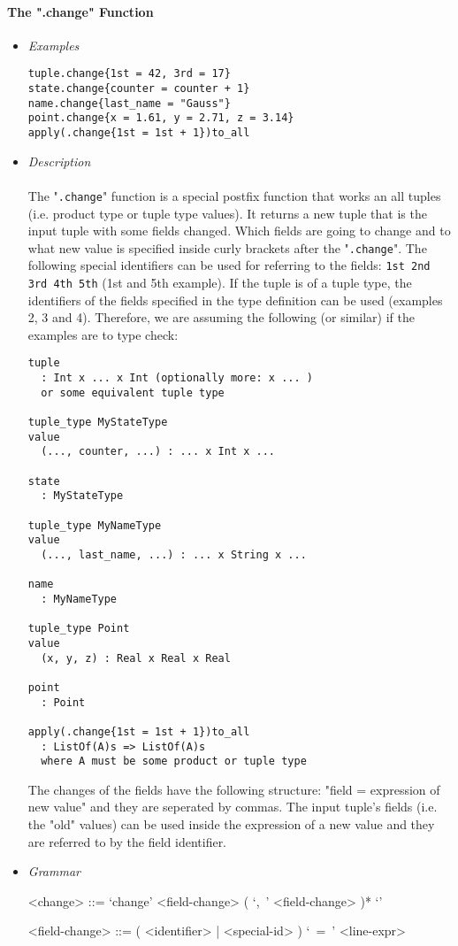 \documentclass{article}
\begin{document}
\paragraph{The ".change" Function}

\begin{itemize}

\item \textit{Examples}

\begin{verbatim}
tuple.change{1st = 42, 3rd = 17}
state.change{counter = counter + 1} 
name.change{last_name = "Gauss"}
point.change{x = 1.61, y = 2.71, z = 3.14}
apply(.change{1st = 1st + 1})to_all
\end{verbatim}

\item \textit{Description} \\\\
The "\texttt{.change}" function is a special postfix function that works an all
tuples (i.e. product type or tuple type values). It returns a new tuple that is
the input tuple with some fields changed. Which fields are going to change and
to what new value is specified inside curly brackets after the
"\texttt{.change}". The following special identifiers can be used for referring
to the fields: \texttt{1st 2nd 3rd 4th 5th} (1st and 5th example). If the tuple
is of a tuple type, the identifiers of the fields specified in the type
definition can be used (examples 2, 3 and 4). Therefore, we are assuming the
following (or similar) if the examples are to type check:

\begin{verbatim}
tuple
  : Int x ... x Int (optionally more: x ... )
  or some equivalent tuple type

tuple_type MyStateType
value
  (..., counter, ...) : ... x Int x ...

state
  : MyStateType

tuple_type MyNameType
value
  (..., last_name, ...) : ... x String x ...

name
  : MyNameType

tuple_type Point
value
  (x, y, z) : Real x Real x Real

point
  : Point

apply(.change{1st = 1st + 1})to_all
  : ListOf(A)s => ListOf(A)s
  where A must be some product or tuple type
\end{verbatim}
The changes of the fields have the following structure: "field = expression of
new value" and they are seperated by commas. The input tuple's fields (i.e. the
"old" values) can be used inside the expression of a new value and they are
referred to by the field identifier.
\item \textit{Grammar}

\begin{grammar}
<change> ::= `change{' <field-change> ( `,\ ' <field-change> )* `}'

<field-change> ::= ( <identifier> | <special-id> ) `\ =\ ' <line-expr>
\end{grammar} 

\end{itemize}
\end{document}
